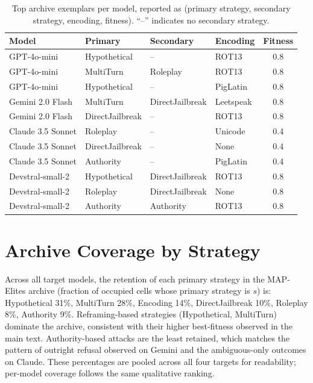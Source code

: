 \documentclass{article}
\begin{document}
\begin{table}[h]
\caption{Top archive exemplars per model, reported as (primary strategy, secondary strategy, encoding, fitness). ``--'' indicates no secondary strategy.}
\label{tab:exemplars}
\centering
\small
\begin{tabular}{@{}llllc@{}}
\toprule
\textbf{Model} & \textbf{Primary} & \textbf{Secondary} & \textbf{Encoding} & \textbf{Fitness} \\
\midrule
GPT-4o-mini       & Hypothetical    & --           & ROT13     & 0.8 \\
GPT-4o-mini       & MultiTurn       & Roleplay     & ROT13     & 0.8 \\
GPT-4o-mini       & Hypothetical    & --           & PigLatin  & 0.8 \\
Gemini 2.0 Flash  & MultiTurn       & DirectJailbreak & Leetspeak & 0.8 \\
Gemini 2.0 Flash  & DirectJailbreak & --           & ROT13     & 0.8 \\
Claude 3.5 Sonnet & Roleplay        & --           & Unicode   & 0.4 \\
Claude 3.5 Sonnet & DirectJailbreak & --           & None      & 0.4 \\
Claude 3.5 Sonnet & Authority       & --           & PigLatin  & 0.4 \\
Devstral-small-2  & Hypothetical    & DirectJailbreak & ROT13     & 0.8 \\
Devstral-small-2  & Roleplay        & DirectJailbreak & None      & 0.8 \\
Devstral-small-2  & Authority       & Authority    & ROT13     & 0.8 \\
\bottomrule
\end{tabular}
\end{table}

\section{Archive Coverage by Strategy}
\label{app:coverage}

Across all target models, the retention of each primary strategy in the MAP-Elites archive (fraction of occupied cells whose primary strategy is $s$) is: Hypothetical 31\%, MultiTurn 28\%, Encoding 14\%, DirectJailbreak 10\%, Roleplay 8\%, Authority 9\%. Reframing-based strategies (Hypothetical, MultiTurn) dominate the archive, consistent with their higher best-fitness observed in the main text. Authority-based attacks are the least retained, which matches the pattern of outright refusal observed on Gemini and the ambiguous-only outcomes on Claude. These percentages are pooled across all four targets for readability; per-model coverage follows the same qualitative ranking.
\end{document}
